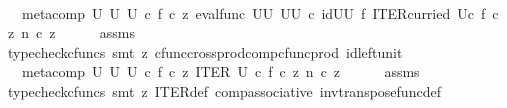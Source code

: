 \begin{isabellebody}
\ \ \isamarkupfalse%
\ \isamarkupfalse%
\ {\isachardoublequoteopen}{\isachardot}{\kern0pt}{\isachardot}{\kern0pt}{\isachardot}{\kern0pt}\ {\isacharequal}{\kern0pt}\ meta{\isacharunderscore}{\kern0pt}comp\ U\ U\ U\ {\isasymcirc}\isactrlsub c\ {\isasymlangle}f\ {\isasymcirc}\isactrlsub c\ z{\isacharcomma}{\kern0pt}\ eval{\isacharunderscore}{\kern0pt}func\ {\isacharparenleft}{\kern0pt}U\isactrlbsup U\isactrlesup {\isacharparenright}{\kern0pt}\ {\isacharparenleft}{\kern0pt}U\isactrlbsup U\isactrlesup {\isacharparenright}{\kern0pt}\ {\isasymcirc}\isactrlsub c\ {\isacharparenleft}{\kern0pt}id{\isacharparenleft}{\kern0pt}U\isactrlbsup U\isactrlesup {\isacharparenright}{\kern0pt}\ {\isasymtimes}\isactrlsub f\ ITER{\isacharunderscore}{\kern0pt}curried\ U{\isacharparenright}{\kern0pt}{\isasymcirc}\isactrlsub c\ {\isasymlangle}f\ {\isasymcirc}\isactrlsub c\ z{\isacharcomma}{\kern0pt}\ n\ {\isasymcirc}\isactrlsub c\ z{\isasymrangle}{\isasymrangle}{\isachardoublequoteclose}\isanewline
\ \ \ \ \isamarkupfalse%
\ assms\ \isamarkupfalse%
\ {\isacharparenleft}{\kern0pt}typecheck{\isacharunderscore}{\kern0pt}cfuncs{\isacharcomma}{\kern0pt}\ smt\ {\isacharparenleft}{\kern0pt}z{}{\isacharparenright}{\kern0pt}\ cfunc{\isacharunderscore}{\kern0pt}cross{\isacharunderscore}{\kern0pt}prod{\isacharunderscore}{\kern0pt}comp{\isacharunderscore}{\kern0pt}cfunc{\isacharunderscore}{\kern0pt}prod\ id{\isacharunderscore}{\kern0pt}left{\isacharunderscore}{\kern0pt}unit{}{\isacharparenright}{\kern0pt}\isanewline
\ \ \isamarkupfalse%
\ \isamarkupfalse%
\ {\isachardoublequoteopen}{\isachardot}{\kern0pt}{\isachardot}{\kern0pt}{\isachardot}{\kern0pt}\ {\isacharequal}{\kern0pt}\ meta{\isacharunderscore}{\kern0pt}comp\ U\ U\ U\ {\isasymcirc}\isactrlsub c\ {\isasymlangle}f\ {\isasymcirc}\isactrlsub c\ z{\isacharcomma}{\kern0pt}\ ITER\ U\ {\isasymcirc}\isactrlsub c\ {\isasymlangle}f\ {\isasymcirc}\isactrlsub c\ z{\isacharcomma}{\kern0pt}\ n\ {\isasymcirc}\isactrlsub c\ z{\isasymrangle}{\isasymrangle}{\isachardoublequoteclose}\isanewline
\ \ \ \ \isamarkupfalse%
\ assms\ \isamarkupfalse%
\ {\isacharparenleft}{\kern0pt}typecheck{\isacharunderscore}{\kern0pt}cfuncs{\isacharcomma}{\kern0pt}\ smt\ {\isacharparenleft}{\kern0pt}z{}{\isacharparenright}{\kern0pt}\ ITER{\isacharunderscore}{\kern0pt}def\ comp{\isacharunderscore}{\kern0pt}associative{}\ inv{\isacharunderscore}{\kern0pt}transpose{\isacharunderscore}{\kern0pt}func{\isacharunderscore}{\kern0pt}def{}{\isacharparenright}{\kern0pt}\isanewline

\end{isabellebody}
